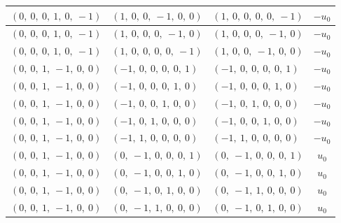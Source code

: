 \documentclass[11pt]{article}
\theoremstyle{definition}
\begin{document}
\begin{longtable}{|l|l|l|c|}
    \hline
    $\left( 0, \  0, \  0, \  1, \  0, \  -1\right)$ & $\left( 1, \  0, \  0, \  -1, \  0, \  0\right)$ & $\left( 1, \  0, \  0, \  0, \  0, \  -1\right)$ & $- u_{0}$ \\
    \hline
    $\left( 0, \  0, \  0, \  1, \  0, \  -1\right)$ & $\left( 1, \  0, \  0, \  0, \  -1, \  0\right)$ & $\left( 1, \  0, \  0, \  0, \  -1, \  0\right)$ & $- u_{0}$ \\
    \hline
    $\left( 0, \  0, \  0, \  1, \  0, \  -1\right)$ & $\left( 1, \  0, \  0, \  0, \  0, \  -1\right)$ & $\left( 1, \  0, \  0, \  -1, \  0, \  0\right)$ & $- u_{0}$ \\
    \hline
    $\left( 0, \  0, \  1, \  -1, \  0, \  0\right)$ & $\left( -1, \  0, \  0, \  0, \  0, \  1\right)$ & $\left( -1, \  0, \  0, \  0, \  0, \  1\right)$ & $- u_{0}$ \\
    \hline
    $\left( 0, \  0, \  1, \  -1, \  0, \  0\right)$ & $\left( -1, \  0, \  0, \  0, \  1, \  0\right)$ & $\left( -1, \  0, \  0, \  0, \  1, \  0\right)$ & $- u_{0}$ \\
    \hline
    $\left( 0, \  0, \  1, \  -1, \  0, \  0\right)$ & $\left( -1, \  0, \  0, \  1, \  0, \  0\right)$ & $\left( -1, \  0, \  1, \  0, \  0, \  0\right)$ & $- u_{0}$ \\
    \hline
    $\left( 0, \  0, \  1, \  -1, \  0, \  0\right)$ & $\left( -1, \  0, \  1, \  0, \  0, \  0\right)$ & $\left( -1, \  0, \  0, \  1, \  0, \  0\right)$ & $- u_{0}$ \\
    \hline
    $\left( 0, \  0, \  1, \  -1, \  0, \  0\right)$ & $\left( -1, \  1, \  0, \  0, \  0, \  0\right)$ & $\left( -1, \  1, \  0, \  0, \  0, \  0\right)$ & $- u_{0}$ \\
    \hline
    $\left( 0, \  0, \  1, \  -1, \  0, \  0\right)$ & $\left( 0, \  -1, \  0, \  0, \  0, \  1\right)$ & $\left( 0, \  -1, \  0, \  0, \  0, \  1\right)$ & $u_{0}$ \\
    \hline
    $\left( 0, \  0, \  1, \  -1, \  0, \  0\right)$ & $\left( 0, \  -1, \  0, \  0, \  1, \  0\right)$ & $\left( 0, \  -1, \  0, \  0, \  1, \  0\right)$ & $u_{0}$ \\
    \hline
    $\left( 0, \  0, \  1, \  -1, \  0, \  0\right)$ & $\left( 0, \  -1, \  0, \  1, \  0, \  0\right)$ & $\left( 0, \  -1, \  1, \  0, \  0, \  0\right)$ & $u_{0}$ \\
    \hline
    $\left( 0, \  0, \  1, \  -1, \  0, \  0\right)$ & $\left( 0, \  -1, \  1, \  0, \  0, \  0\right)$ & $\left( 0, \  -1, \  0, \  1, \  0, \  0\right)$ & $u_{0}$ \\

\end{longtable}
\end{document}
